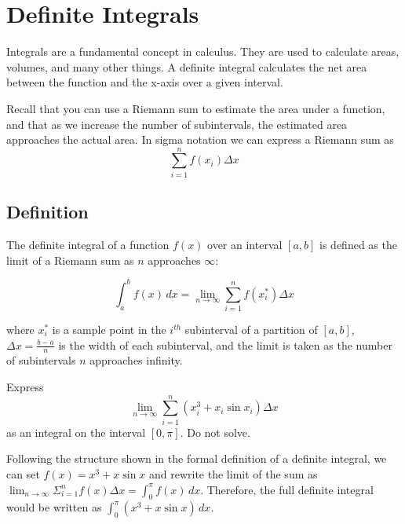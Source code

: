 \chapter{Definite Integrals}
Integrals are a fundamental concept in calculus. They are used to
calculate areas, volumes, and many other things. A definite integral
calculates the net area between the function and the x-axis over a
given interval.

Recall that you can use a Riemann sum to estimate the area under a 
function, and that as we increase the number of subintervals, the 
estimated area approaches the actual area. In sigma notation we can 
express a Riemann sum as $$\sum_{i=1}^{n} f(x_i)\Delta x$$

\section{Definition}
The definite integral of a function $f(x)$ over an interval $[a, b]$
is defined as the limit of a Riemann sum as $n$ approaches $\infty$:

\begin{equation}
\int_{a}^{b} f(x) \, dx = \lim_{{n \to \infty}} \sum_{i=1}^{n} 
f(x_i^*) \Delta x
\end{equation}

where $x_i^*$ is a sample point in the $i^{th}$ subinterval of a
partition of $[a, b]$, $\Delta x = \frac{b-a}{n}$ is the width of each
subinterval, and the limit is taken as the number of subintervals $n$
approaches infinity.

\begin{Exercise}[label=defint1]
Express $$\lim_{n \to \infty} \sum_{i=1}^{n} (x_i^3 + x_i\sin{x_i})
\Delta x$$ as an integral on the interval $[0, \pi]$. Do not solve.
\end{Exercise}

\begin{Answer}[ref=defint1]
Following the structure shown in the formal definition of a definite 
integral, we can set $f(x) = x^3 + x\sin{x}$ and rewrite the limit of 
the sum as $\lim_{n \to \infty} \Sigma_{i=1}^{n} f(x)\Delta x = 
\int_{0}^{\pi} f(x)\,dx$. Therefore, the full definite integral 
would be written as $\int_{0}^{\pi} (x^3 + x\sin{x})\, dx$. 
\end{Answer}

